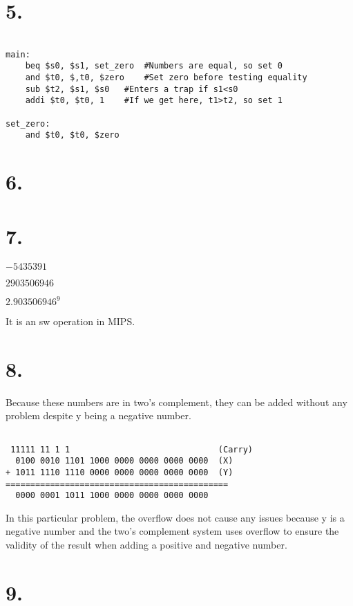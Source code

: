 \documentclass[12pt]{article}
\begin{document}
\section*{5.}

\begin{lstlisting}

main:
	beq $s0, $s1, set_zero	#Numbers are equal, so set 0
	and $t0, $,t0, $zero    #Set zero before testing equality
	sub $t2, $s1, $s0	#Enters a trap if s1<s0
	addi $t0, $t0, 1 	#If we get here, t1>t2, so set 1

set_zero:
	and $t0, $t0, $zero

\end{lstlisting}



\section*{6.}

\section*{7.}

 $-5435391$

 $2903506946$

 $2.903506946^9$

 It is an sw operation in MIPS.

\section*{8.}

Because these numbers are in two's complement, they can be added without any problem despite y being a negative number.

\begin{verbatim}

 11111 11 1 1                              (Carry)
  0100 0010 1101 1000 0000 0000 0000 0000  (X)
+ 1011 1110 1110 0000 0000 0000 0000 0000  (Y)
=============================================
  0000 0001 1011 1000 0000 0000 0000 0000
\end{verbatim}

In this particular problem, the overflow does not cause any issues because y is a negative number and the two's complement system uses overflow to ensure the validity of the result when adding a positive and negative number.

\section*{9.}
\end{document}
